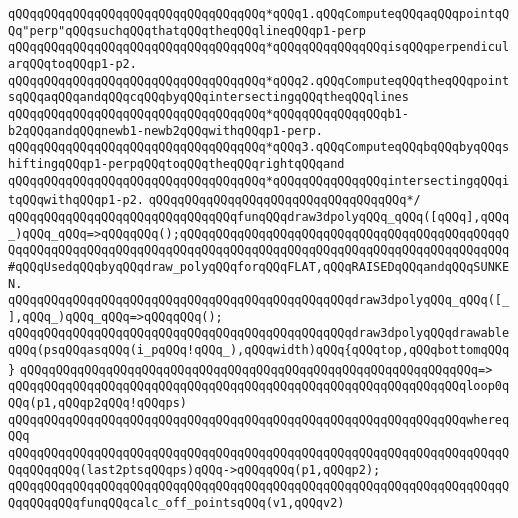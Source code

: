 \verb|qQQqqQQqqQQqqQQqqQQqqQQqqQQqqQQqqQQq*qQQq1.qQQqComputeqQQqaqQQqpointqQQq"perp"qQQqsuchqQQqthatqQQqtheqQQqlineqQQqp1-perp|\newline
\verb|qQQqqQQqqQQqqQQqqQQqqQQqqQQqqQQqqQQq*qQQqqQQqqQQqqQQqisqQQqperpendicularqQQqtoqQQqp1-p2.|\newline
\verb|qQQqqQQqqQQqqQQqqQQqqQQqqQQqqQQqqQQq*qQQq2.qQQqComputeqQQqtheqQQqpointsqQQqaqQQqandqQQqcqQQqbyqQQqintersectingqQQqtheqQQqlines|\newline
\verb|qQQqqQQqqQQqqQQqqQQqqQQqqQQqqQQqqQQq*qQQqqQQqqQQqqQQqb1-b2qQQqandqQQqnewb1-newb2qQQqwithqQQqp1-perp.|\newline
\verb|qQQqqQQqqQQqqQQqqQQqqQQqqQQqqQQqqQQq*qQQq3.qQQqComputeqQQqbqQQqbyqQQqshiftingqQQqp1-perpqQQqtoqQQqtheqQQqrightqQQqand|\newline
\verb|qQQqqQQqqQQqqQQqqQQqqQQqqQQqqQQqqQQq*qQQqqQQqqQQqqQQqintersectingqQQqitqQQqwithqQQqp1-p2.|\newline
\verb|qQQqqQQqqQQqqQQqqQQqqQQqqQQqqQQqqQQq*/|\newline
\newline
\verb|qQQqqQQqqQQqqQQqqQQqqQQqqQQqqQQqfunqQQqdraw3dpolyqQQq_qQQq([qQQq],qQQq_)qQQq_qQQq=>qQQqqQQq();qQQqqQQqqQQqqQQqqQQqqQQqqQQqqQQqqQQqqQQqqQQqqQQqqQQqqQQqqQQqqQQqqQQqqQQqqQQqqQQqqQQqqQQqqQQqqQQqqQQqqQQqqQQqqQQqqQQq#qQQqUsedqQQqbyqQQqdraw_polyqQQqforqQQqFLAT,qQQqRAISEDqQQqandqQQqSUNKEN.|\newline
\verb|qQQqqQQqqQQqqQQqqQQqqQQqqQQqqQQqqQQqqQQqqQQqqQQqdraw3dpolyqQQq_qQQq([_],qQQq_)qQQq_qQQq=>qQQqqQQq();|\newline
\newline
\verb|qQQqqQQqqQQqqQQqqQQqqQQqqQQqqQQqqQQqqQQqqQQqqQQqdraw3dpolyqQQqdrawableqQQq(psqQQqasqQQq(i_pqQQq!qQQq_),qQQqwidth)qQQq{qQQqtop,qQQqbottomqQQq}|\newline
\verb|qQQqqQQqqQQqqQQqqQQqqQQqqQQqqQQqqQQqqQQqqQQqqQQqqQQqqQQqqQQqqQQq=>|\newline
\verb|qQQqqQQqqQQqqQQqqQQqqQQqqQQqqQQqqQQqqQQqqQQqqQQqqQQqqQQqqQQqqQQqloop0qQQq(p1,qQQqp2qQQq!qQQqps)|\newline
\verb|qQQqqQQqqQQqqQQqqQQqqQQqqQQqqQQqqQQqqQQqqQQqqQQqqQQqqQQqqQQqqQQqwhereqQQq|\newline
\verb|qQQqqQQqqQQqqQQqqQQqqQQqqQQqqQQqqQQqqQQqqQQqqQQqqQQqqQQqqQQqqQQqqQQqqQQqqQQqqQQq(last2ptsqQQqps)qQQq->qQQqqQQq(p1,qQQqp2);|\newline
\newline
\verb|qQQqqQQqqQQqqQQqqQQqqQQqqQQqqQQqqQQqqQQqqQQqqQQqqQQqqQQqqQQqqQQqqQQqqQQqqQQqqQQqfunqQQqcalc_off_pointsqQQq(v1,qQQqv2)|\newline
